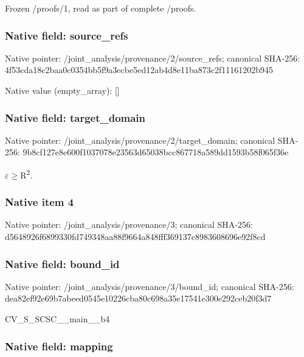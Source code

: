 \documentclass[10pt,a4paper]{article}
\begin{document}
Frozen /proofs/1, read as part of complete /proofs.


\subsubsection{Native field: source\_refs}


Native pointer: /joint\_analysis/provenan\allowbreak{}ce/2/source\_refs; canonical SHA-256: 4f53cda18c2baa0c0354bb5f\allowbreak{}9a3ecbe5ed12ab4d8e11ba87\allowbreak{}3c2f11161202b945



Native value (empty\_array): []



\subsubsection{Native field: target\_domain}


Native pointer: /joint\_analysis/provenan\allowbreak{}ce/2/target\_domain; canonical SHA-256: 9b8cf127e8e600f1037078e2\allowbreak{}3563d65038bcc867718a589d\allowbreak{}d1593b58f065f36e


\ensuremath{\varepsilon}\ensuremath{\ge}R\textsuperscript{2}.


\subsubsection{Native item 4}


Native pointer: /joint\_analysis/provenance/3; canonical SHA-256: d5648926f6899330fd749348\allowbreak{}aa88f9664a848fff369137c8\allowbreak{}983608696e92f8cd



\subsubsection{Native field: bound\_id}


Native pointer: /joint\_analysis/provenance/3/bound\_id; canonical SHA-256: dea82ef92e69b7abeed0545e\allowbreak{}10226cba80c698a35e17541e\allowbreak{}300e292ceb20f3d7


CV\_S\_SCSC\_\_main\_\_b4


\subsubsection{Native field: mapping}
\end{document}
